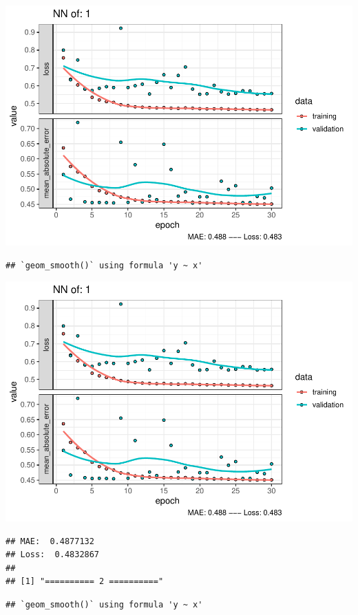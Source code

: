 \documentclass[
]{article}
\begin{document}
\includegraphics{project-code_files/figure-latex/unnamed-chunk-18-1.pdf}

\begin{verbatim}
## `geom_smooth()` using formula 'y ~ x'
\end{verbatim}

\includegraphics{project-code_files/figure-latex/unnamed-chunk-18-2.pdf}

\begin{verbatim}
## MAE:  0.4877132
## Loss:  0.4832867 
## 
## [1] "========== 2 =========="
\end{verbatim}

\begin{verbatim}
## `geom_smooth()` using formula 'y ~ x'
\end{verbatim}
\end{document}
